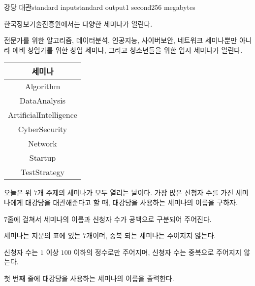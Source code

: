 \begin{problem}{강당 대관}{standard input}{standard output}{1 second}{256 megabytes}

한국정보기술진흥원에서는 다양한 세미나가 열린다.

전문가를 위한 알고리즘, 데이터분석, 인공지능, 사이버보안, 네트워크 세미나뿐만 아니라 예비 창업가를 위한 창업 세미나, 그리고 청소년들을 위한 입시 세미나가 열린다.
\begin{center}
\begin{tabular}{|c|} \hline
  세미나 \\ \hline
  Algorithm \\ \hline
  DataAnalysis \\ \hline
  ArtificialIntelligence \\ \hline
  CyberSecurity \\ \hline
  Network \\ \hline
  Startup \\ \hline
  TestStrategy \\ \hline
\end{tabular}
\end{center}

오늘은 위 $7$개 주제의 세미나가 모두 열리는 날이다. 가장 많은 신청자 수를 가진 세미나에게 대강당을 대관해준다고 할 때, 대강당을 사용하는 세미나의 이름을 구하자.

\InputFile
$7$줄에 걸쳐서 세미나의 이름과 신청자 수가 공백으로 구분되어 주어진다.

세미나는 지문의 표에 있는 $7$개이며, 중복 되는 세미나는 주어지지 않는다.

신청자 수는 $1$ 이상 $100$ 이하의 정수로만 주어지며, 신청자 수는 중복으로 주어지지 않는다.

\OutputFile
첫 번째 줄에 대강당을 사용하는 세미나의 이름을 출력한다.

\Example

\begin{example}
%
\end{example}

\end{problem}

